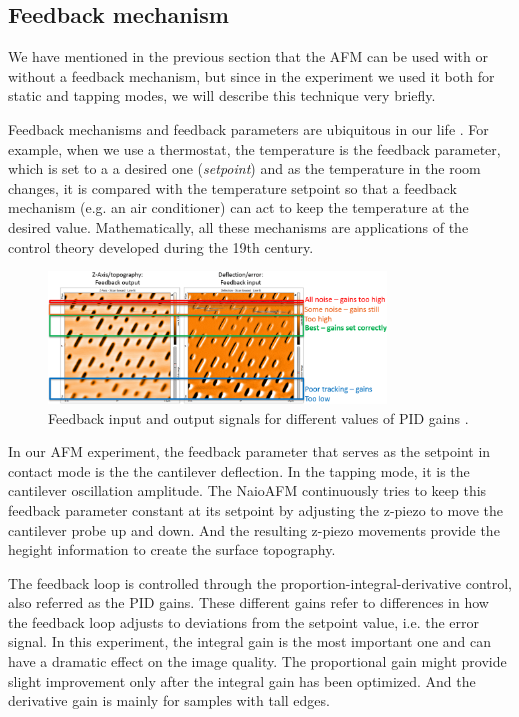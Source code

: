 \documentclass[11pt,a4paper]{article}
\begin{document}
\subsection{Feedback mechanism}
We have mentioned in the previous section that the AFM can be used with or without a feedback mechanism, but since in the experiment we used it both for static and tapping modes, we will describe this technique very briefly.

Feedback mechanisms and feedback parameters are ubiquitous in our life \cite{nanosurf}. For example, when we use a thermostat, the temperature is the feedback parameter, which is set to a a desired one (\emph{setpoint}) and as the temperature in the room changes, it is compared with the temperature setpoint so that a feedback mechanism (e.g. an air conditioner) can act to keep the temperature at the desired value. Mathematically, all these mechanisms are applications of the control theory developed during the 19th century.

\begin{figure}[hbt]
\centering
\includegraphics[width=0.8\textwidth]{afm-modes-feedback}
\caption{Feedback input and output signals for different values of PID gains \cite{nanosurf}.}
\label{fig:feedback}
\end{figure}

In our AFM experiment, the feedback parameter that serves as the setpoint in contact mode is the the cantilever deflection. In the tapping mode, it is the cantilever oscillation amplitude. The NaioAFM continuously tries to keep this feedback parameter constant at its setpoint by adjusting the z-piezo to move the cantilever probe up and down. And the resulting z-piezo movements provide the hegight information to create the surface topography.

The feedback loop is controlled through the proportion-integral-derivative control, also referred as the PID gains. These different gains refer to differences in how the feedback loop adjusts to deviations from the setpoint value, i.e. the error signal. In this experiment, the integral gain is the most important one and can have a dramatic effect on the image quality. The proportional gain might provide slight improvement only after the integral gain has been optimized. And the derivative gain is mainly for samples with tall edges.
\end{document}
